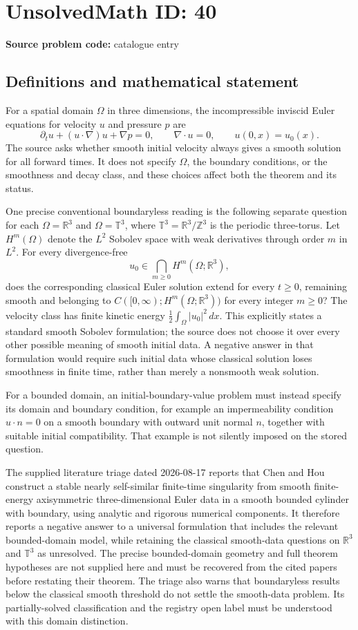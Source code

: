 \documentclass[11pt]{article}
\newcommand{\Z}{\mathbb{Z}}
\newcommand{\R}{\mathbb{R}}
\begin{document}
\section*{UnsolvedMath ID: 40}
\textbf{Source problem code:} catalogue entry
\subsection{Definitions and mathematical statement}
For a spatial domain $\Omega$ in three dimensions, the incompressible inviscid Euler equations for velocity $u$ and pressure $p$ are
\[
\partial_t u+(u\cdot\nabla)u+\nabla p=0,\qquad \nabla\cdot u=0,\qquad u(0,x)=u_0(x).
\]
The source asks whether smooth initial velocity always gives a smooth solution for all forward times. It does not specify $\Omega$, the boundary conditions, or the smoothness and decay class, and these choices affect both the theorem and its status.

One precise conventional boundaryless reading is the following separate question for each $\Omega=\R^3$ and $\Omega=\mathbb T^3$, where $\mathbb T^3=\R^3/\Z^3$ is the periodic three-torus. Let $H^m(\Omega)$ denote the $L^2$ Sobolev space with weak derivatives through order $m$ in $L^2$. For every divergence-free
\[
u_0\in\bigcap_{m\geq0}H^m(\Omega;\R^3),
\]
does the corresponding classical Euler solution extend for every $t\geq0$, remaining smooth and belonging to $C([0,\infty);H^m(\Omega;\R^3))$ for every integer $m\geq0$? The velocity class has finite kinetic energy $\frac12\int_\Omega|u_0|^2\,dx$. This explicitly states a standard smooth Sobolev formulation; the source does not choose it over every other possible meaning of smooth initial data. A negative answer in that formulation would require such initial data whose classical solution loses smoothness in finite time, rather than merely a nonsmooth weak solution.

For a bounded domain, an initial-boundary-value problem must instead specify its domain and boundary condition, for example an impermeability condition $u\cdot n=0$ on a smooth boundary with outward unit normal $n$, together with suitable initial compatibility. That example is not silently imposed on the stored question.

The supplied literature triage dated 2026-08-17 reports that Chen and Hou construct a stable nearly self-similar finite-time singularity from smooth finite-energy axisymmetric three-dimensional Euler data in a smooth bounded cylinder with boundary, using analytic and rigorous numerical components. It therefore reports a negative answer to a universal formulation that includes the relevant bounded-domain model, while retaining the classical smooth-data questions on $\R^3$ and $\mathbb T^3$ as unresolved. The precise bounded-domain geometry and full theorem hypotheses are not supplied here and must be recovered from the cited papers before restating their theorem. The triage also warns that boundaryless results below the classical smooth threshold do not settle the smooth-data problem. Its partially-solved classification and the registry open label must be understood with this domain distinction.
\end{document}
